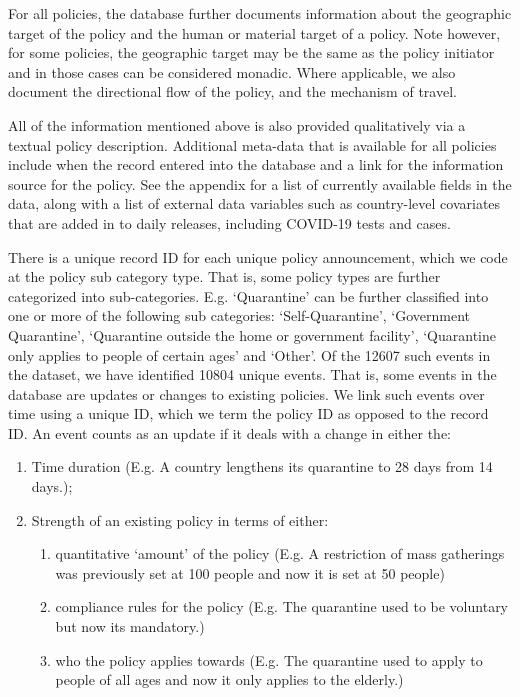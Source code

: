 \documentclass[]{article}
\providecommand{\tightlist}{%
  \setlength{\itemsep}{0pt}\setlength{\parskip}{0pt}}
\begin{document}
For all policies, the database further documents information about the geographic target of the policy and the human or material target of a policy. Note however, for some policies, the geographic target may be the same as the policy initiator and in those cases can be considered monadic. Where applicable, we also document the directional flow of the policy, and the mechanism of travel.

All of the information mentioned above is also provided qualitatively via a textual policy description. Additional meta-data that is available for all policies include when the record entered into the database and a link for the information source for the policy. See the appendix for a list of currently available fields in the data, along with a list of external data variables such as country-level covariates that are added in to daily releases, including COVID-19 tests and cases.

There is a unique record ID for each unique policy announcement, which we code at the policy sub category type. That is, some policy types are further categorized into sub-categories. E.g. `Quarantine' can be further classified into one or more of the following sub categories: `Self-Quarantine', `Government Quarantine', `Quarantine outside the home or government facility', `Quarantine only applies to people of certain ages' and `Other'. Of the 12607 such events in the dataset, we have identified 10804 unique events. That is, some events in the database are updates or changes to existing policies. We link such events over time using a unique ID, which we term the policy ID as opposed to the record ID. An event counts as an update if it deals with a change in either the:

\begin{enumerate}
\def\labelenumi{\arabic{enumi}.}
\tightlist
\item
  Time duration (E.g. A country lengthens its quarantine to 28 days from 14 days.);
\item
  Strength of an existing policy in terms of either:

  \begin{enumerate}
  \def\labelenumii{\alph{enumii}.}
  \tightlist
  \item
    quantitative `amount' of the policy (E.g. A restriction of mass gatherings was previously set at 100 people and now it is set at 50 people)
  \item
    compliance rules for the policy (E.g. The quarantine used to be voluntary but now its mandatory.)
  \item
    who the policy applies towards (E.g. The quarantine used to apply to people of all ages and now it only applies to the elderly.)
  \end{enumerate}
\end{enumerate}
\end{document}
